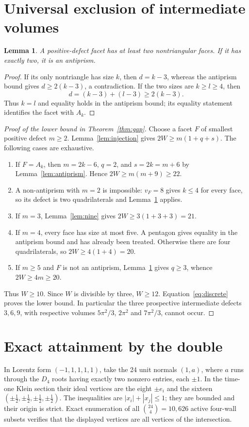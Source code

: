 \documentclass[11pt]{article}
\newtheorem{lemma}[theorem]{Lemma}
\begin{document}
\section{Universal exclusion of intermediate volumes}
\begin{lemma}\label{lem:two}
A positive-defect facet has at least two nontriangular faces. If it
has exactly two, it is an antiprism.
\end{lemma}
\begin{proof}
If its only nontriangle has size $k$, then $d=k-3$, whereas the
antiprism bound gives $d\ge2(k-3)$, a contradiction. If the two sizes
are $k\ge l\ge4$, then
\[
 d=(k-3)+(l-3)\ge2(k-3).
\]
Thus $k=l$ and equality holds in the antiprism bound; its equality
statement identifies the facet with $A_k$.
\end{proof}

\begin{proof}[Proof of the lower bound in Theorem~\ref{thm:gap}]
Choose a facet $F$ of smallest positive defect $m\ge2$.
Lemma~\ref{lem:injection} gives $2W\ge m(1+q+s)$.
The following cases are exhaustive.
\begin{enumerate}
\item If $F=A_k$, then $m=2k-6$, $q=2$, and
$s=2k=m+6$ by Lemma~\ref{lem:antiprism}. Hence
$2W\ge m(m+9)\ge22$.
\item A non-antiprism with $m=2$ is impossible: $v_F=8$ gives
$k\le4$ for every face, so its defect is two quadrilaterals and
Lemma~\ref{lem:two} applies.
\item If $m=3$, Lemma~\ref{lem:nine} gives $2W\ge3(1+3+3)=21$.
\item If $m=4$, every face has size at most five. A pentagon gives
equality in the antiprism bound and has already been treated. Otherwise
there are four quadrilaterals, so $2W\ge4(1+4)=20$.
\item If $m\ge5$ and $F$ is not an antiprism,
Lemma~\ref{lem:two} gives $q\ge3$, whence $2W\ge4m\ge20$.
\end{enumerate}
Thus $W\ge10$. Since $W$ is divisible by three, $W\ge12$.
Equation~\eqref{eq:discrete} proves the lower bound. In particular the
three prospective intermediate defects $3,6,9$, with respective
volumes $5\pi^2/3$, $2\pi^2$ and $7\pi^2/3$, cannot occur.
\end{proof}

\section{Exact attainment by the double}
In Lorentz form $(-1,1,1,1,1)$, take the 24 unit normals $(1,a)$,
where $a$ runs through the $D_4$ roots having exactly two nonzero
entries, each $\pm1$. In the time-one Klein section their ideal
vertices are the eight $\pm e_i$ and the sixteen
$(\pm\tfrac12,\pm\tfrac12,\pm\tfrac12,\pm\tfrac12)$.
The inequalities are $|x_i|+|x_j|\le1$; they are bounded and their
origin is strict. Exact enumeration of all $\binom{24}{4}=10,626$
active four-wall subsets verifies that the displayed vertices are all
vertices of the intersection.
\end{document}
